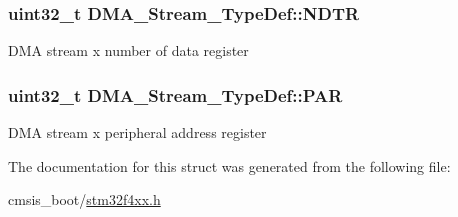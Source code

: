 \subsubsection[{\texorpdfstring{N\+D\+TR}{NDTR}}]{ uint32\+\_\+t D\+M\+A\+\_\+\+Stream\+\_\+\+Type\+Def\+::\+N\+D\+TR}\hypertarget{struct_d_m_a___stream___type_def_a2cc2a52628182f9e79ab1e49bb78a1eb}{}\label{struct_d_m_a___stream___type_def_a2cc2a52628182f9e79ab1e49bb78a1eb}
D\+MA stream x number of data register 
\subsubsection[{\texorpdfstring{P\+AR}{PAR}}]{ uint32\+\_\+t D\+M\+A\+\_\+\+Stream\+\_\+\+Type\+Def\+::\+P\+AR}\hypertarget{struct_d_m_a___stream___type_def_adbeac1d47cb85ab52dac71d520273947}{}\label{struct_d_m_a___stream___type_def_adbeac1d47cb85ab52dac71d520273947}
D\+MA stream x peripheral address register 

The documentation for this struct was generated from the following file\+:\begin{DoxyCompactItemize}
\item 
cmsis\+\_\+boot/\hyperlink{stm32f4xx_8h}{stm32f4xx.\+h}\end{DoxyCompactItemize}

